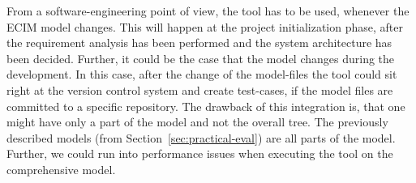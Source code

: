 From a software-engineering point of view, the tool has to be used, whenever the ECIM model changes. 
This will happen at the project initialization phase, after the requirement analysis has been performed and the system architecture has been decided. 
Further, it could be the case that the model changes during the development. In this case, after the change of the model-files the tool could sit right at the version control system and create test-cases, if the model files are committed to a specific repository. 
The drawback of this integration is, that one might have only a part of the model and not the overall tree.
The previously described models (from Section~\ref{sec:practical-eval}) are all parts of the model. Further, we could run into performance issues when executing the tool on the comprehensive model.

%
